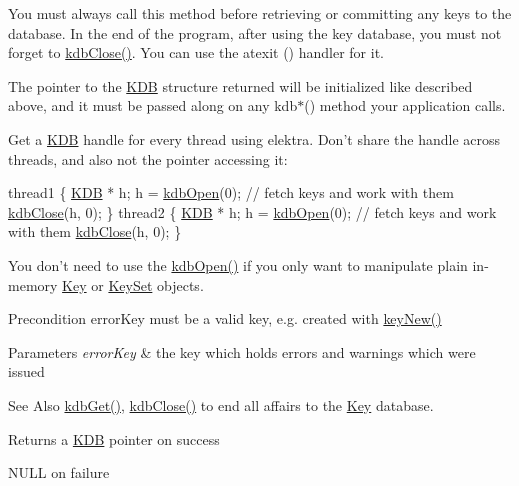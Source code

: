 You must always call this method before retrieving or committing any keys to the database. In the end of the program, after using the key database, you must not forget to \hyperlink{group__kdb_gadb54dc9fda17ee07deb9444df745c96f}{kdb\-Close()}. You can use the atexit () handler for it.

The pointer to the {\ttfamily \hyperlink{classkdb_1_1KDB}{K\-D\-B}} structure returned will be initialized like described above, and it must be passed along on any kdb$\ast$() method your application calls.

Get a {\ttfamily \hyperlink{classkdb_1_1KDB}{K\-D\-B}} handle for every thread using elektra. Don't share the handle across threads, and also not the pointer accessing it\-: 
\begin{DoxyCode}
thread1
\{
        \hyperlink{classkdb_1_1KDB_a7e0637995ce9f294cdbc6f167df6db40}{KDB} * h;
        h = \hyperlink{group__kdb_ga6808defe5870f328dd17910aacbdc6ca}{kdbOpen}(0);
        \textcolor{comment}{// fetch keys and work with them}
        \hyperlink{group__kdb_gadb54dc9fda17ee07deb9444df745c96f}{kdbClose}(h, 0);
\}
thread2
\{
        \hyperlink{classkdb_1_1KDB_a7e0637995ce9f294cdbc6f167df6db40}{KDB} * h;
        h = \hyperlink{group__kdb_ga6808defe5870f328dd17910aacbdc6ca}{kdbOpen}(0);
        \textcolor{comment}{// fetch keys and work with them}
        \hyperlink{group__kdb_gadb54dc9fda17ee07deb9444df745c96f}{kdbClose}(h, 0);
\}
\end{DoxyCode}


You don't need to use the \hyperlink{group__kdb_ga6808defe5870f328dd17910aacbdc6ca}{kdb\-Open()} if you only want to manipulate plain in-\/memory \hyperlink{classkdb_1_1Key}{Key} or \hyperlink{classkdb_1_1KeySet}{Key\-Set} objects.

\begin{DoxyPrecond}{Precondition}
error\-Key must be a valid key, e.\-g. created with \hyperlink{group__key_gad23c65b44bf48d773759e1f9a4d43b89}{key\-New()}
\end{DoxyPrecond}

\begin{DoxyParams}{Parameters}
{\em error\-Key} & the key which holds errors and warnings which were issued \\
\hline
\end{DoxyParams}
\begin{DoxySeeAlso}{See Also}
\hyperlink{group__kdb_ga28e385fd9cb7ccfe0b2f1ed2f62453a1}{kdb\-Get()}, \hyperlink{group__kdb_gadb54dc9fda17ee07deb9444df745c96f}{kdb\-Close()} to end all affairs to the \hyperlink{group__key}{Key} database. 
\end{DoxySeeAlso}
\begin{DoxyReturn}{Returns}
a \hyperlink{classkdb_1_1KDB}{K\-D\-B} pointer on success 

N\-U\-L\-L on failure 
\end{DoxyReturn}
 

